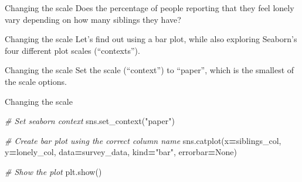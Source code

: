 \documentclass[
  ignorenonframetext,
]{beamer}
\newenvironment{Shaded}{\begin{snugshade}}{\end{snugshade}}
\newcommand{\CommentTok}[1]{\textcolor[rgb]{0.56,0.35,0.01}{\textit{#1}}}
\newcommand{\NormalTok}[1]{#1}
\newcommand{\OperatorTok}[1]{\textcolor[rgb]{0.81,0.36,0.00}{\textbf{#1}}}
\newcommand{\StringTok}[1]{\textcolor[rgb]{0.31,0.60,0.02}{#1}}
\newcommand{\VariableTok}[1]{\textcolor[rgb]{0.00,0.00,0.00}{#1}}
\begin{document}
\begin{frame}{Changing the scale}
\label{changing-the-scale-3}
Does the percentage of people reporting that they feel lonely vary
depending on how many siblings they have?
\end{frame}

\begin{frame}{Changing the scale}
\label{changing-the-scale-4}
Let's find out using a bar plot, while also exploring Seaborn's four
different plot scales (``contexts'').
\end{frame}

\begin{frame}{Changing the scale}
\label{changing-the-scale-5}
Set the scale (``context'') to ``paper'', which is the smallest of the
scale options.
\end{frame}

\begin{frame}[fragile]{Changing the scale}
\label{changing-the-scale-6}

\begin{Shaded}
\begin{Highlighting}[]
\CommentTok{\# Set seaborn context}
\NormalTok{sns.set\_context(}\StringTok{"paper"}\NormalTok{)}

\CommentTok{\# Create bar plot using the correct column name}
\NormalTok{sns.catplot(x}\OperatorTok{=}\NormalTok{siblings\_col, y}\OperatorTok{=}\NormalTok{lonely\_col, }
\NormalTok{            data}\OperatorTok{=}\NormalTok{survey\_data, kind}\OperatorTok{=}\StringTok{"bar"}\NormalTok{, errorbar}\OperatorTok{=}\VariableTok{None}\NormalTok{)}

\CommentTok{\# Show the plot}
\NormalTok{plt.show()}
\end{Highlighting}
\end{Shaded}
\end{frame}
\end{document}
